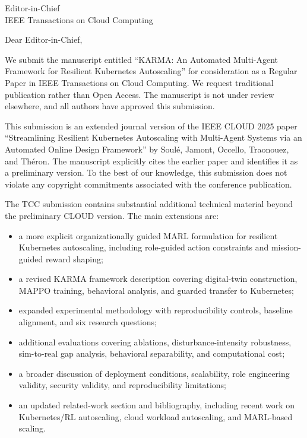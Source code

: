 \documentclass[11pt]{letter}
\begin{document}
\begin{letter}{Editor-in-Chief\\IEEE Transactions on Cloud Computing}

  \opening{Dear Editor-in-Chief,}

  We submit the manuscript entitled ``KARMA: An Automated Multi-Agent Framework for Resilient Kubernetes Autoscaling'' for consideration as a Regular Paper in IEEE Transactions on Cloud Computing. We request traditional publication rather than Open Access. The manuscript is not under review elsewhere, and all authors have approved this submission.

  This submission is an extended journal version of the IEEE CLOUD 2025 paper ``Streamlining Resilient Kubernetes Autoscaling with Multi-Agent Systems via an Automated Online Design Framework'' by Soulé, Jamont, Occello, Traonouez, and Théron. The manuscript explicitly cites the earlier paper and identifies it as a preliminary version. To the best of our knowledge, this submission does not violate any copyright commitments associated with the conference publication.

  The TCC submission contains substantial additional technical material beyond the preliminary CLOUD version. The main extensions are:

  \begin{itemize}
    \item a more explicit organizationally guided MARL formulation for resilient Kubernetes autoscaling, including role-guided action constraints and mission-guided reward shaping;
    \item a revised KARMA framework description covering digital-twin construction, MAPPO training, behavioral analysis, and guarded transfer to Kubernetes;
    \item expanded experimental methodology with reproducibility controls, baseline alignment, and six research questions;
    \item additional evaluations covering ablations, disturbance-intensity robustness, sim-to-real gap analysis, behavioral separability, and computational cost;
    \item a broader discussion of deployment conditions, scalability, role engineering validity, security validity, and reproducibility limitations;
    \item an updated related-work section and bibliography, including recent work on Kubernetes/RL autoscaling, cloud workload autoscaling, and MARL-based scaling.
  \end{itemize}


\end{letter}
\end{document}
